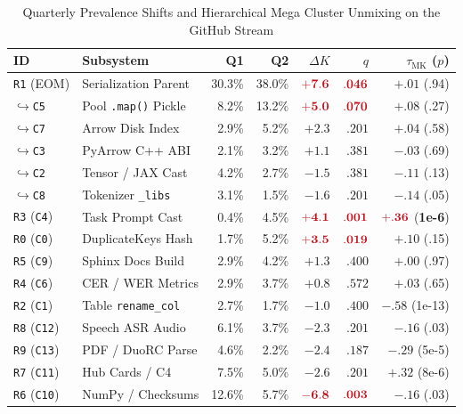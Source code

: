 \documentclass[sigconf,nonacm,pbalance]{acmart}
\newcommand{\hl}[1]{\textcolor{hlred}{\mathbf{#1}}}
\newcommand{\hlt}[1]{\textcolor{hlred}{\textbf{#1}}}
\begin{document}
\begin{table}[!htbp]
  \caption{Quarterly Prevalence Shifts and Hierarchical Mega Cluster Unmixing on the GitHub Stream}
  \label{tab:exp2}
  \footnotesize
  \setlength{\tabcolsep}{1.15pt}
  \begin{tabular}{llrrrrr}
    \toprule
    ID & Subsystem & Q1 & Q2 & $\Delta K$ & $q$ & $\tau_{\text{MK}}$ ($p$) \\
    \midrule
    \texttt{R1} (EOM) & Serialization Parent & 30.3\% & 38.0\% & $\hl{+7.6}$ & $\hl{.046}$ & $+.01$ (.94) \\
    \hspace{2pt}$\hookrightarrow$\texttt{C5} & Pool \texttt{.map()} Pickle & 8.2\% & 13.2\% & $\hl{+5.0}$ & $\hl{.070}$ & $+.08$ (.27) \\
    \hspace{2pt}$\hookrightarrow$\texttt{C7} & Arrow Disk Index & 2.9\% & 5.2\% & $+2.3$ & $.201$ & $+.04$ (.58) \\
    \hspace{2pt}$\hookrightarrow$\texttt{C3} & PyArrow C++ ABI & 2.1\% & 3.2\% & $+1.1$ & $.381$ & $-.03$ (.69) \\
    \hspace{2pt}$\hookrightarrow$\texttt{C2} & Tensor / JAX Cast & 4.2\% & 2.7\% & $-1.5$ & $.381$ & $-.11$ (.13) \\
    \hspace{2pt}$\hookrightarrow$\texttt{C8} & Tokenizer \texttt{\_libs} & 3.1\% & 1.5\% & $-1.6$ & $.201$ & $-.14$ (.05) \\
    \addlinespace[2pt]
    \texttt{R3} (\texttt{C4}) & Task Prompt Cast & 0.4\% & 4.5\% & $\hl{+4.1}$ & $\hl{.001}$ & $\hl{+.36}$ (\hlt{1e-6}) \\
    \texttt{R0} (\texttt{C0}) & DuplicateKeys Hash & 1.7\% & 5.2\% & $\hl{+3.5}$ & $\hl{.019}$ & $+.10$ (.15) \\
    \texttt{R5} (\texttt{C9}) & Sphinx Docs Build & 2.9\% & 4.2\% & $+1.3$ & $.400$ & $+.00$ (.97) \\
    \texttt{R4} (\texttt{C6}) & CER / WER Metrics & 2.9\% & 3.7\% & $+0.8$ & $.572$ & $+.03$ (.65) \\
    \texttt{R2} (\texttt{C1}) & Table \texttt{rename\_col} & 2.7\% & 1.7\% & $-1.0$ & $.400$ & $-.58$ (1e-13) \\
    \texttt{R8} (\texttt{C12}) & Speech ASR Audio & 6.1\% & 3.7\% & $-2.3$ & $.201$ & $-.16$ (.03) \\
    \texttt{R9} (\texttt{C13}) & PDF / DuoRC Parse & 4.6\% & 2.2\% & $-2.4$ & $.187$ & $-.29$ (5e-5) \\
    \texttt{R7} (\texttt{C11}) & Hub Cards / C4 & 7.5\% & 5.0\% & $-2.6$ & $.201$ & $+.32$ (8e-6) \\
    \texttt{R6} (\texttt{C10}) & NumPy / Checksums & 12.6\% & 5.7\% & $\hl{-6.8}$ & $\hl{.003}$ & $-.16$ (.03) \\
    \bottomrule
  \end{tabular}
\end{table}
\end{document}
